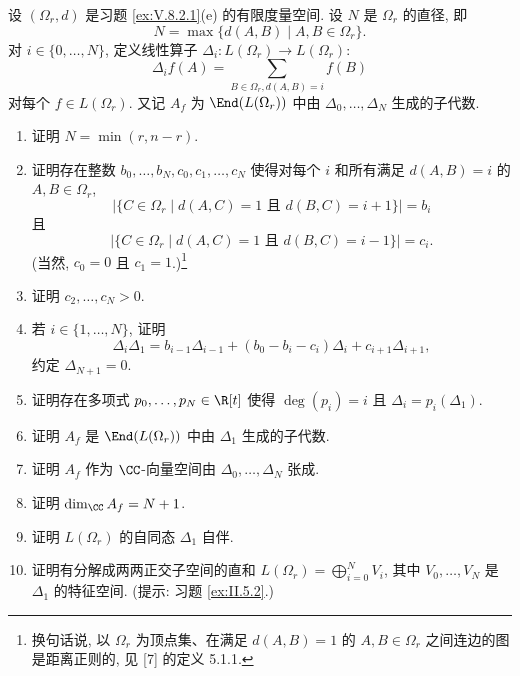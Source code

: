 \begin{exercise}
\label{ex:V.8.2.2}
设 $(\Omega_r, d)$ 是习题 \ref{ex:V.8.2.1}(e) 的有限度量空间. 设 $N$ 是 $\Omega_r$ 的直径, 即
\[
N = \max\{d(A, B) \mid A, B \in \Omega_r\}.
\]
对 $i \in \{0, \ldots, N\}$, 定义线性算子 $\Delta_i \colon L(\Omega_r) \to L(\Omega_r)$:
\[
\Delta_if(A) = \sum_{B \in \Omega_r, d(A,B)=i}f(B)
\]
对每个 $f \in L(\Omega_r)$. 又记 $A_f$ 为 $\End(L(\Omega_r))$ 中由 $\Delta_0, \ldots, \Delta_N$ 生成的子代数.
\begin{enumerate}
\item[(a)] 证明 $N = \min(r, n - r)$.
\item[(b)] 证明存在整数 $b_0, \ldots, b_N, c_0, c_1, \ldots, c_N$ 使得对每个 $i$ 和所有满足 $d(A, B) = i$ 的 $A, B \in \Omega_r$,
\[
|\{C \in \Omega_r \mid d(A, C) = 1 \text{ 且 } d(B, C) = i + 1\}| = b_i
\]
且
\[
|\{C \in \Omega_r \mid d(A, C) = 1 \text{ 且 } d(B, C) = i - 1\}| = c_i.
\]
(当然, $c_0 = 0$ 且 $c_1 = 1$.)\footnote{换句话说, 以 $\Omega_r$ 为顶点集、在满足 $d(A, B) = 1$ 的 $A, B \in \Omega_r$ 之间连边的图是距离正则的, 见 {[}7{]} 的定义 5.1.1.}
\item[(c)] 证明 $c_2, \ldots, c_N > 0$.
\item[(d)] 若 $i \in \{1, \ldots, N\}$, 证明
\[
\Delta_i\Delta_1 = b_{i-1}\Delta_{i-1} + (b_0 - b_i - c_i)\Delta_i + c_{i+1}\Delta_{i+1},
\]
约定 $\Delta_{N+1} = 0$.
\item[(e)] 证明存在多项式 $p_0, \ldots, p_N \in \R[t]$ 使得 $\deg(p_i) = i$ 且 $\Delta_i = p_i(\Delta_1)$.
\item[(f)] 证明 $A_f$ 是 $\End(L(\Omega_r))$ 中由 $\Delta_1$ 生成的子代数.
\item[(g)] 证明 $A_f$ 作为 $\CC$-向量空间由 $\Delta_0, \ldots, \Delta_N$ 张成.
\item[(h)] 证明 $\dim_{\CC}A_f = N + 1$.
\item[(i)] 证明 $L(\Omega_r)$ 的自同态 $\Delta_1$ 自伴.
\item[(j)] 证明有分解成两两正交子空间的直和 $L(\Omega_r) = \bigoplus_{i=0}^N V_i$, 其中 $V_0, \ldots, V_N$ 是 $\Delta_1$ 的特征空间. (提示: 习题 \ref{ex:II.5.2}.)
\end{enumerate}
\end{exercise}

